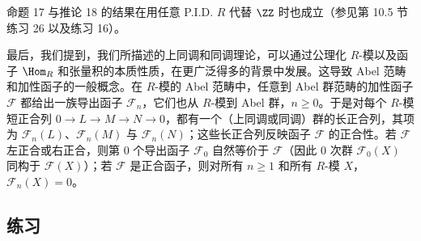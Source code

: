 命题 17 与推论 18 的结果在用任意 P.I.D. $R$ 代替 $\ZZ$ 时也成立（参见第 10.5 节练习 26 以及练习 16）。

最后，我们提到，我们所描述的上同调和同调理论，可以通过公理化 $R$-模以及函子 $\Hom_R$ 和张量积的本质性质，在更广泛得多的背景中发展。这导致 Abel 范畴和加性函子的一般概念。在 $R$-模的 Abel 范畴中，任意到 Abel 群范畴的加性函子 $\mathcal F$ 都给出一族导出函子 $\mathcal F_n$，它们也从 $R$-模到 Abel 群，$n\geq0$。于是对每个 $R$-模短正合列 $0\to L\to M\to N\to0$，都有一个（上同调或同调）群的长正合列，其项为 $\mathcal F_n(L)$、$\mathcal F_n(M)$ 与 $\mathcal F_n(N)$；这些长正合列反映函子 $\mathcal F$ 的正合性。若 $\mathcal F$ 左正合或右正合，则第 $0$ 个导出函子 $\mathcal F_0$ 自然等价于 $\mathcal F$（因此 $0$ 次群 $\mathcal F_0(X)$ 同构于 $\mathcal F(X)$）；若 $\mathcal F$ 是正合函子，则对所有 $n\geq1$ 和所有 $R$-模 $X$，$\mathcal F_n(X)=0$。

\subsection*{练习}

